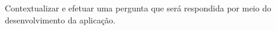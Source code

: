 \justify


\hspace{0.5cm} Contextualizar e efetuar uma pergunta que será respondida por meio do desenvolvimento da aplicação.
